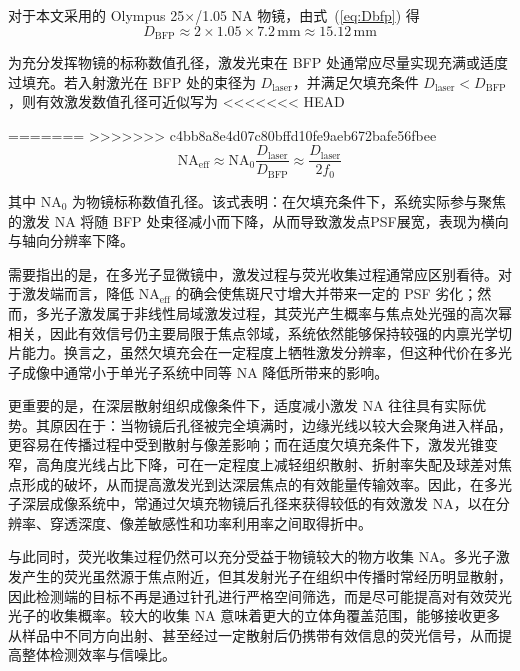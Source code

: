 对于本文采用的 Olympus 25$\times$/1.05 NA 物镜，由式~(\ref{eq:Dbfp}) 得
\begin{equation}
  D_{\mathrm{BFP}}\approx 2\times1.05\times7.2\,\mathrm{mm}\approx 15.12\,\mathrm{mm}
  \label{eq:Dbfp_olympus}
\end{equation}

为充分发挥物镜的标称数值孔径，激发光束在 BFP 处通常应尽量实现充满或适度过填充。若入射激光在 BFP 处的束径为 $D_{\mathrm{laser}}$，并满足欠填充条件 $D_{\mathrm{laser}}<D_{\mathrm{BFP}}$，则有效激发数值孔径可近似写为
<<<<<<< HEAD

=======
>>>>>>> c4bb8a8e4d07c80bffd10fe9aeb672bafe56fbee
\begin{equation}
  \mathrm{NA}_{\mathrm{eff}}\approx \mathrm{NA}_{0}\frac{D_{\mathrm{laser}}}{D_{\mathrm{BFP}}}
  \approx \frac{D_{\mathrm{laser}}}{2f_0}
  \label{eq:NAeff}
\end{equation}

其中 $\mathrm{NA}_{0}$ 为物镜标称数值孔径。该式表明：在欠填充条件下，系统实际参与聚焦的激发 NA 将随 BFP 处束径减小而下降，从而导致激发点PSF展宽，表现为横向与轴向分辨率下降。

需要指出的是，在多光子显微镜中，激发过程与荧光收集过程通常应区别看待。对于激发端而言，降低 $\mathrm{NA}_{\mathrm{eff}}$ 的确会使焦斑尺寸增大并带来一定的 PSF 劣化；然而，多光子激发属于非线性局域激发过程，其荧光产生概率与焦点处光强的高次幂相关，因此有效信号仍主要局限于焦点邻域，系统依然能够保持较强的内禀光学切片能力。换言之，虽然欠填充会在一定程度上牺牲激发分辨率，但这种代价在多光子成像中通常小于单光子系统中同等 NA 降低所带来的影响。

更重要的是，在深层散射组织成像条件下，适度减小激发 NA 往往具有实际优势\cite{RN372}。其原因在于：当物镜后孔径被完全填满时，边缘光线以较大会聚角进入样品，更容易在传播过程中受到散射与像差影响；而在适度欠填充条件下，激发光锥变窄，高角度光线占比下降，可在一定程度上减轻组织散射、折射率失配及球差对焦点形成的破坏，从而提高激发光到达深层焦点的有效能量传输效率。因此，在多光子深层成像系统中，常通过欠填充物镜后孔径来获得较低的有效激发 NA，以在分辨率、穿透深度、像差敏感性和功率利用率之间取得折中。

与此同时，荧光收集过程仍然可以充分受益于物镜较大的物方收集 NA。多光子激发产生的荧光虽然源于焦点附近，但其发射光子在组织中传播时常经历明显散射，因此检测端的目标不再是通过针孔进行严格空间筛选，而是尽可能提高对有效荧光光子的收集概率。较大的收集 NA 意味着更大的立体角覆盖范围，能够接收更多从样品中不同方向出射、甚至经过一定散射后仍携带有效信息的荧光信号，从而提高整体检测效率与信噪比。

